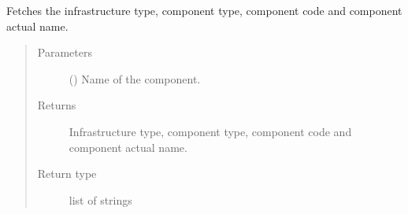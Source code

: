 \documentclass[letterpaper,10pt,english]{sphinxmanual}
\begin{document}
\begin{fulllineitems}
\label{\detokenize{apidoc:dreaminsg_integrated_model.src.network_sim_models.interdependencies.get_compon_details}}
\sphinxAtStartPar
Fetches the infrastructure type, component type, component code and component actual name.
\begin{quote}\begin{description}
\item[{Parameters}] \leavevmode
\sphinxAtStartPar
{} () \textendash{} Name of the component.

\item[{Returns}] \leavevmode
\sphinxAtStartPar
Infrastructure type, component type, component code and component actual name.

\item[{Return type}] \leavevmode
\sphinxAtStartPar
list of strings

\end{description}\end{quote}

\end{fulllineitems}

\end{document}
